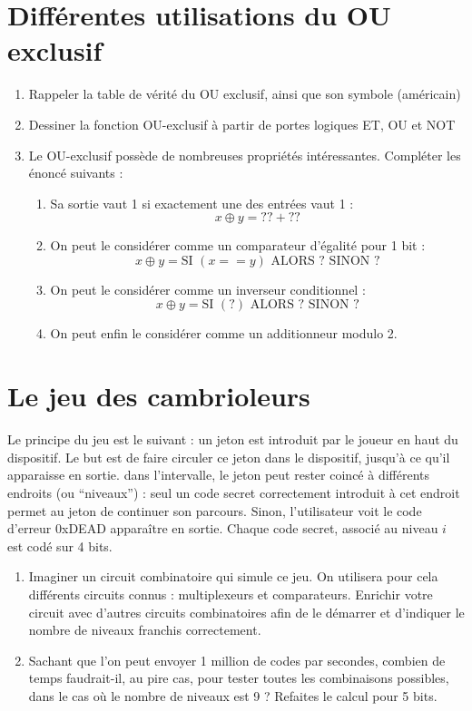 \documentclass[a4paper,11pt]{article}
\begin{document}
\section{Différentes utilisations du OU exclusif}
\begin{enumerate}

\item Rappeler la table de vérité du OU exclusif, ainsi que son symbole (américain)
\item Dessiner la fonction OU-exclusif à partir de portes logiques ET, OU et NOT
\item Le OU-exclusif possède de nombreuses propriétés intéressantes. Compléter les énoncé suivants :

\begin{enumerate}
\item Sa sortie vaut 1 si exactement une des entrées vaut 1 : $$x \oplus y  = ?? + ??$$
\item On peut le considérer comme un comparateur d'égalité pour 1 bit : $$x \oplus y = \textrm{SI } (x==y) \textrm{ ALORS ? SINON ?} $$
\item On peut le considérer comme un inverseur conditionnel : $$x \oplus y = \textrm{SI } (?) \textrm{ ALORS ? SINON ?}$$
\item On peut enfin le considérer comme un additionneur modulo 2.

\end{enumerate}

\end{enumerate}

\section{Le jeu des cambrioleurs}
Le principe du jeu est le suivant : un jeton est introduit par le joueur en haut du dispositif. Le but est de faire circuler ce jeton dans le dispositif, jusqu'à ce qu'il apparaisse en sortie. dans l'intervalle, le jeton peut rester coincé à différents endroits (ou ``niveaux'') : seul un code secret correctement introduit à cet endroit permet au jeton de continuer son parcours. Sinon, l'utilisateur voit le code d'erreur 0xDEAD apparaître en sortie. Chaque code secret, associé au niveau $i$ est codé sur 4 bits.

\begin{enumerate}
\item Imaginer un circuit combinatoire qui simule ce jeu.  On utilisera pour cela différents circuits connus : multiplexeurs et comparateurs. Enrichir votre circuit avec d'autres circuits combinatoires afin de le démarrer et d'indiquer le nombre de niveaux franchis correctement.
\item Sachant que l'on peut envoyer 1 million de codes par secondes, combien de temps faudrait-il, au pire cas, pour tester toutes les combinaisons possibles, dans le cas où le nombre de niveaux est 9 ? Refaites le calcul pour 5 bits.
\end{enumerate}
\end{document}
